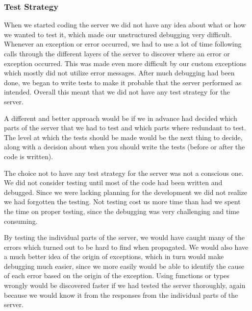 \subsubsection{Test Strategy}
When we started coding the server we did not have any idea about what or how we wanted to test it, which made our unstructured debugging very difficult.
Whenever an exception or error occurred, we had to use a lot of time following calls through the different layers of the server to discover where an error or exception occurred.
This was made even more difficult by our custom exceptions which mostly did not utilize error messages.
After much debugging had been done, we began to write tests to make it probable that the server performed as intended.
Overall this meant that we did not have any test strategy for the server.

A different and better approach would be if we in advance had decided which parts of the server that we had to test and which parts where redundant to test.
The level at which the tests should be made would be the next thing to decide, along with a decision about when you should write the tests (before or after the code is written).

The choice not to have any test strategy for the server was not a conscious one.
We did not consider testing until most of the code had been written and debugged.
Since we were lacking planning for the development we did not realize we had forgotten the testing.
Not testing cost us more time than had we spent the time on proper testing, since the debugging was very challenging and time consuming.

By testing the individual parts of the server, we would have caught many of the errors which turned out to be hard to find when propagated.
We would also have a much better idea of the origin of exceptions, which in turn would make debugging much easier, since we more easily would be able to identify the cause of each error based on the origin of the exception.
Using functions or types wrongly would be discovered faster if we had tested the server thoroughly, again because we would know it from the responses from the individual parts of the server.